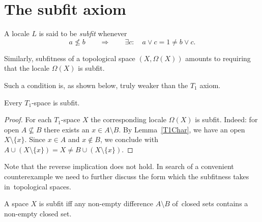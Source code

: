 \section{The subfit axiom}

\begin{df}[Sfit]
  A locale $L$ is said to be {\sl subfit\/} whenever
  \[
    a \not\le b \qquad \Rightarrow \qquad \exists c: \quad a \vee c = 1 \ne b
    \vee c.
  \]
\end{df}

Similarly, subfitness of a topological space $(X, \Omega(X))$ amounts to
requiring that the locale $\Omega(X)$ is subfit.

Such a condition is, as shown below, truly weaker than the $T_1$ axiom.

\begin{prop}
  Every $T_1$-space is subfit.
\end{prop}

\begin{proof}
  For each $T_1$-space $X$ the corresponding locale $\Omega(X)$ is subfit.
  Indeed: for open $A\not\subseteq B$ there exists an $x\in A \setminus B$.
  By Lemma~\ref{T1Char}\thinspace, we have an open $X\setminus \{x\}$.
  Since $x\in A$ and $x\not\in B$, we conclude with $A\cup (X\setminus \{x\}) =
  X \ne B \cup (X\setminus \{x\})$.
\end{proof}

Note that the reverse implication does not hold.
In search of a convenient counterexample we need to further discuss the form
which the subfitness takes in~topological spaces.

\begin{prop}
  A space $X$ is subfit iff any non-empty difference $A\setminus B$ of~closed
  sets contains a non-empty closed set.
\end{prop}

